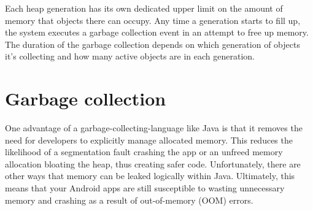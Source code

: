 Each heap generation has its own dedicated upper limit on the amount of memory that objects there can occupy. Any time a generation starts to fill up, the system executes a garbage collection event in an attempt to free up memory. The duration of the garbage collection depends on which generation of objects it's collecting and how many active objects are in each generation.

\section{Garbage collection}



One advantage of a garbage-collecting-language like Java is that it removes the need for developers to explicitly manage allocated memory. This reduces the likelihood of a segmentation fault crashing the app or an unfreed memory allocation bloating the heap, thus creating safer code. Unfortunately, there are other ways that memory can be leaked logically within Java. Ultimately, this means that your Android apps are still susceptible to wasting unnecessary memory and crashing as a result of out-of-memory (OOM) errors.
